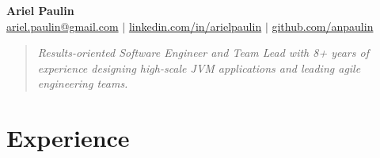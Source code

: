\documentclass[letterpaper,11pt]{article}
\newcommand{\resumeSubHeadingListStart}{\begin{itemize}[leftmargin=0.15in, label={}]}
\newcommand{\resumeSubHeadingListEnd}{\end{itemize}}
\begin{document}

\begin{center}
    \textbf{\Huge Ariel Paulin} \\ \vspace{2pt}
    \small{
    \href{mailto:ariel.paulin@gmail.com}{ariel.paulin@gmail.com} $|$ 
    \href{https://www.linkedin.com/in/arielpaulin}{linkedin.com/in/arielpaulin} $|$
    \href{https://github.com/anpaulin}{github.com/anpaulin}
    }
    \vspace{2pt}
\end{center}
\begin{quote}
    \vspace{2pt}
    \small\textit{Results-oriented Software Engineer and Team Lead with 8+ years of experience designing high-scale JVM applications and leading agile engineering teams.}
    \vspace{-5pt}
\end{quote}

\section{Experience}
  \resumeSubHeadingListStart
    
    
    
    
    
  \resumeSubHeadingListEnd

\end{document}
